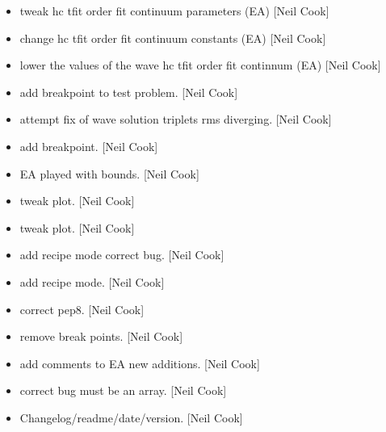 \documentclass[a4paper,10pt,english]{report}
\begin{document}
\begin{itemize}
\item {} 
 \sphinxhyphen{} tweak hc tfit order fit
continuum parameters (EA) {[}Neil Cook{]}

\item {} 
 \sphinxhyphen{} change hc tfit order
fit continuum constants (EA) {[}Neil Cook{]}

\item {} 
 \sphinxhyphen{} lower the values of the
wave hc tfit order fit continnum (EA) {[}Neil Cook{]}

\item {} 
 \sphinxhyphen{} add breakpoint to test problem. {[}Neil Cook{]}

\item {} 
 \sphinxhyphen{} attempt fix of wave solution triplets rms
diverging. {[}Neil Cook{]}

\item {} 
 \sphinxhyphen{} add breakpoint. {[}Neil Cook{]}

\item {} 
 \sphinxhyphen{} EA played with bounds. {[}Neil Cook{]}

\item {} 
 \sphinxhyphen{} tweak plot. {[}Neil Cook{]}

\item {} 
 \sphinxhyphen{} tweak plot. {[}Neil Cook{]}

\item {} 
 \sphinxhyphen{} add recipe mode \sphinxhyphen{} correct
bug. {[}Neil Cook{]}

\item {} 
 \sphinxhyphen{} add recipe mode. {[}Neil
Cook{]}

\item {} 
 \sphinxhyphen{} correct pep8. {[}Neil Cook{]}

\item {} 
 \sphinxhyphen{} remove break points. {[}Neil Cook{]}

\item {} 
 \sphinxhyphen{} add comments to EA new additions. {[}Neil
Cook{]}

\item {} 
 \sphinxhyphen{} correct bug  must be an array. {[}Neil
Cook{]}

\item {} 
Changelog/readme/date/version. {[}Neil Cook{]}

\end{itemize}
\end{document}
